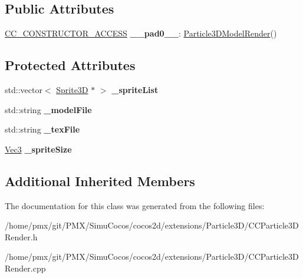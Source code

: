 \subsection*{Public Attributes}
\begin{DoxyCompactItemize}
\item 
\mbox{\label{classParticle3DModelRender_af962548da834ebf008e6f71eeac7d681}} 
\hyperlink{_2cocos2d_2cocos_2base_2ccConfig_8h_a25ef1314f97c35a2ed3d029b0ead6da0}{C\+C\+\_\+\+C\+O\+N\+S\+T\+R\+U\+C\+T\+O\+R\+\_\+\+A\+C\+C\+E\+SS} {\bfseries \+\_\+\+\_\+pad0\+\_\+\+\_\+}\+: \hyperlink{classParticle3DModelRender}{Particle3\+D\+Model\+Render}()
\end{DoxyCompactItemize}
\subsection*{Protected Attributes}
\begin{DoxyCompactItemize}
\item 
\mbox{\label{classParticle3DModelRender_a27514cf2750868a1dc08de594d29f370}} 
std\+::vector$<$ \hyperlink{classSprite3D}{Sprite3D} $\ast$ $>$ {\bfseries \+\_\+sprite\+List}
\item 
\mbox{\label{classParticle3DModelRender_ac841317d2545bd9e132f2cf27784114f}} 
std\+::string {\bfseries \+\_\+model\+File}
\item 
\mbox{\label{classParticle3DModelRender_a87b8bb040eab6cb797323cb849c3726e}} 
std\+::string {\bfseries \+\_\+tex\+File}
\item 
\mbox{\label{classParticle3DModelRender_a4771c6be9d9613d63f209ea7820e85b7}} 
\hyperlink{classVec3}{Vec3} {\bfseries \+\_\+sprite\+Size}
\end{DoxyCompactItemize}
\subsection*{Additional Inherited Members}


The documentation for this class was generated from the following files\+:\begin{DoxyCompactItemize}
\item 
/home/pmx/git/\+P\+M\+X/\+Simu\+Cocos/cocos2d/extensions/\+Particle3\+D/C\+C\+Particle3\+D\+Render.\+h\item 
/home/pmx/git/\+P\+M\+X/\+Simu\+Cocos/cocos2d/extensions/\+Particle3\+D/C\+C\+Particle3\+D\+Render.\+cpp\end{DoxyCompactItemize}
